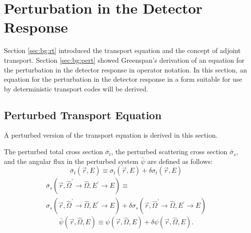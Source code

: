 \chapter{Perturbation in the Detector Response}
\label{chap:dr}

Section \ref{sec:bg:rt} introduced the transport equation and the concept of adjoint transport.
Section \ref{sec:bg:pert} showed Greenspan's derivation of an equation for the perturbation in the detector response in operator notation.
In this section, an equation for the perturbation in the detector response in a form suitable for use by deterministic transport codes will be derived.

\section{Perturbed Transport Equation}
\label{sec:dr:pte}

A perturbed version of the transport equation is derived in this section.

The perturbed total cross section $\bar{\sigma}_t$, the perturbed scattering cross section $\bar{\sigma}_s$, and the angular flux in the perturbed system $\bar{\psi}$ are defined as follows:
\begin{equation}\label{eq:dr:sigma_t_bar}
  \bar{\sigma}_t\left(\vec{r},E\right) \equiv
  \sigma_t      \left(\vec{r},E\right) +
  \delta\sigma_t\left(\vec{r},E\right)
\end{equation}
\begin{multline}\label{eq:dr:sigma_s_bar}
  \bar{\sigma}_s\left(\vec{r},\hat{\Omega}^\prime\rightarrow\hat{\Omega},E^\prime\rightarrow E\right) \equiv \\
  \sigma_s      \left(\vec{r},\hat{\Omega}^\prime\rightarrow\hat{\Omega},E^\prime\rightarrow E\right) +
  \delta\sigma_s\left(\vec{r},\hat{\Omega}^\prime\rightarrow\hat{\Omega},E^\prime\rightarrow E\right)
\end{multline}
\begin{equation}\label{eq:dr:psi_bar}
  \bar{\psi}\left(\vec{r},\hat{\Omega},E\right) \equiv
  \psi      \left(\vec{r},\hat{\Omega},E\right) +
  \delta\psi\left(\vec{r},\hat{\Omega},E\right).
\end{equation}

